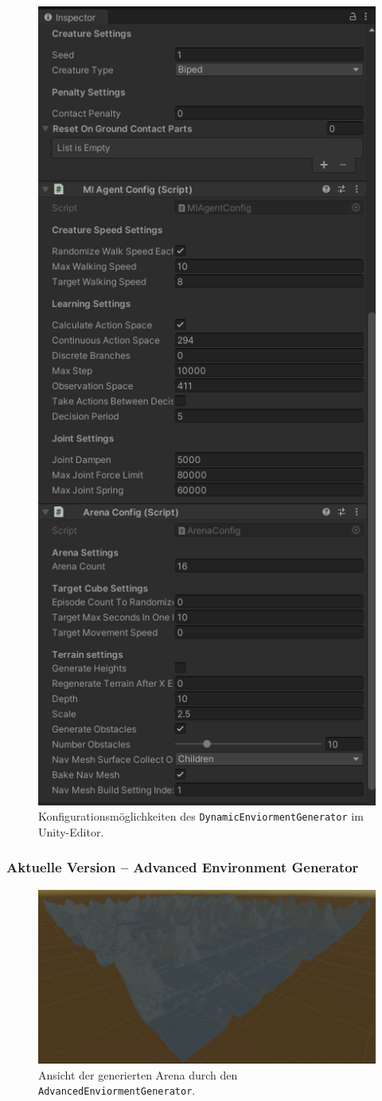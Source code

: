 \begin{figure}
	\centering
	\includegraphics[width=0.4\linewidth]{resources/img/DEGConfig}
	\caption[Konfigurationsmöglichkeiten des \texttt{DynamicEnviormentGenerator}]{Konfigurationsmöglichkeiten des \texttt{DynamicEnviormentGenerator} im Unity-Editor.} 
	\label{bspDEGOptionen}
\end{figure}

\subsubsection{Aktuelle Version -- Advanced Environment Generator}
\begin{figure}
	\centering
	\includegraphics[width=0.7\linewidth]{resources/img/AEGArena.png}
	\caption[Konfigurationsmöglichkeiten des \texttt{AdvancedEnviormentGenerator}]{Ansicht der generierten Arena durch den \texttt{AdvancedEnviormentGenerator}.} 
	\label{bspAEGArena}
\end{figure}

